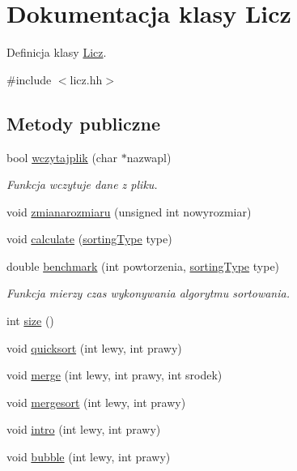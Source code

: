 \hypertarget{class_licz}{\section{Dokumentacja klasy Licz}
\label{class_licz}
}


Definicja klasy \hyperlink{class_licz}{Licz}.  




{\ttfamily \#include $<$licz.\-hh$>$}

\subsection*{Metody publiczne}
\begin{DoxyCompactItemize}
\item 
bool \hyperlink{class_licz_aeb97a155eb71e9d611c2f3607e80047b}{wczytajplik} (char $\ast$nazwapl)
\begin{DoxyCompactList}\small\item\em Funkcja wczytuje dane z pliku. \end{DoxyCompactList}\item 
void \hyperlink{class_licz_ac34a2c20eee02444a06ed9d3b86d599d}{zmianarozmiaru} (unsigned int nowyrozmiar)
\item 
void \hyperlink{class_licz_a7cfeb2e2964b1173a811e4c34e096f0f}{calculate} (\hyperlink{licz_8hh_a08f516d96c62462f77e4e83d222bfdfb}{sorting\-Type} type)
\item 
double \hyperlink{class_licz_a9d1bd08a72880d8cb9ad95f699cb0170}{benchmark} (int powtorzenia, \hyperlink{licz_8hh_a08f516d96c62462f77e4e83d222bfdfb}{sorting\-Type} type)
\begin{DoxyCompactList}\small\item\em Funkcja mierzy czas wykonywania algorytmu sortowania. \end{DoxyCompactList}\item 
int \hyperlink{class_licz_ae732b0bc554d7ab018a078380ff3977b}{size} ()
\item 
void \hyperlink{class_licz_aacedaec92bb291a6408a67a6f148115b}{quicksort} (int lewy, int prawy)
\item 
void \hyperlink{class_licz_a25beed3159ac45c296235555234ff280}{merge} (int lewy, int prawy, int srodek)
\item 
void \hyperlink{class_licz_a8c9bc3f8009ce40db068ee0d09ab3f6d}{mergesort} (int lewy, int prawy)
\item 
void \hyperlink{class_licz_acea8efaafe430d94190b026a8a33967d}{intro} (int lewy, int prawy)
\item 
void \hyperlink{class_licz_a67d4f646eef07e47e0042988717ffc0b}{bubble} (int lewy, int prawy)
\end{DoxyCompactItemize}


